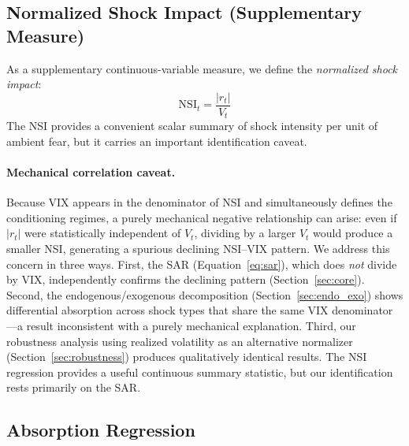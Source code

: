 \documentclass[12pt,a4paper]{article}
\begin{document}
\subsection{Normalized Shock Impact (Supplementary Measure)}

As a supplementary continuous-variable measure, we define the \textit{normalized shock impact}:
\begin{equation}
\text{NSI}_t = \frac{|r_t|}{V_t}
\label{eq:nsi}
\end{equation}
The NSI provides a convenient scalar summary of shock intensity per unit of ambient fear, but it carries an important identification caveat.

\paragraph{Mechanical correlation caveat.} Because VIX appears in the denominator of NSI and simultaneously defines the conditioning regimes, a purely mechanical negative relationship can arise: even if $|r_t|$ were statistically independent of $V_t$, dividing by a larger $V_t$ would produce a smaller NSI, generating a spurious declining NSI--VIX pattern. We address this concern in three ways. First, the SAR (Equation~\ref{eq:sar}), which does \textit{not} divide by VIX, independently confirms the declining pattern (Section~\ref{sec:core}). Second, the endogenous/exogenous decomposition (Section~\ref{sec:endo_exo}) shows differential absorption across shock types that share the same VIX denominator---a result inconsistent with a purely mechanical explanation. Third, our robustness analysis using realized volatility as an alternative normalizer (Section~\ref{sec:robustness}) produces qualitatively identical results. The NSI regression provides a useful continuous summary statistic, but our identification rests primarily on the SAR.

\subsection{Absorption Regression}
\end{document}
